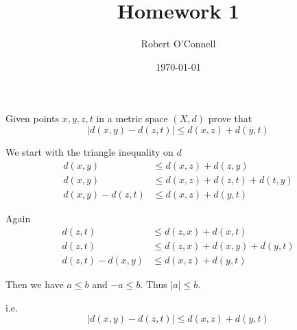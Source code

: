 \documentclass{article}
\title{\textbf{Homework 1}}
\author{Robert O'Connell}
\date{\today}
\begin{document}
\maketitle

\begin{problem}
Given points \( x,y,z,t \) in a metric space \( (X,d) \) prove that
\[
	|d(x,y) - d(z,t)| \le d(x,z) + d(y,t)
\]

\begin{solution}
	We start with the triangle inequality on \( d \)
	\begin{align*}
		d(x,y)          & \le d(x,z) + d(z,y)          \\
		d(x,y)          & \le d(x,z) + d(z,t) + d(t,y) \\
		d(x,y) - d(z,t) & \le d(x,z) + d(y,t)
	\end{align*}

	Again
	\begin{align*}
		d(z,t)          & \le d(z,x) + d(x,t)          \\
		d(z,t)          & \le d(z,x) + d(x,y) + d(y,t) \\
		d(z,t) - d(x,y) & \le d(x,z) + d(y,t)
	\end{align*}

	Then we have \( a \le b \) and \( -a \le b \). Thus \( |a| \le b \).

	i.e.
	\[
		|d(x,y) - d(z,t)| \le d(x,z) + d(y,t)
	\]
\end{solution}
\end{problem}
\end{document}
